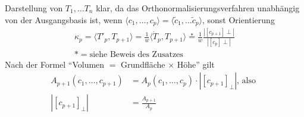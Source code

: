 \begin{beweis}
Darstellung von \(T_1, \ldots T_n \) klar, da das Orthonormalisierungsverfahren unabhängig von der Ausgangsbasis ist, wenn \( \langle c_1, \ldots , c_p \rangle = \langle  \widetilde c_1, \dots \widetilde c_p \rangle\), sonst Orientierung
\begin{align*}
 \kappa_p = \langle T'_p, T_{p+1} \rangle = \frac{1}{w} \langle \dot T_p, T_{p+1} \rangle \stackrel{\ast}{=} \frac{1}{w} \frac{|\left[c_{p+1} \right]\perp|}{|\left[c_p \right]\perp|}\\
 \ast = \text{siehe Beweis des Zusatzes}
\end{align*}
Nach der Formel "`Volumen \(=\) Grundfläche \(\times\) Höhe"' gilt
\begin{align*}
  A_{p+1} (c_1, \dots , c_{p+1}) &= A_p \left(c_1, \dots , c_p \right) \cdot \left|\left[c_{p+1}\right]_\perp\right| \text{, also } \\
  \left|\left[c_{p+1}\right]_\perp\right| &= \frac{A_{p+1}}{A_p}
\end{align*}
\end{beweis}